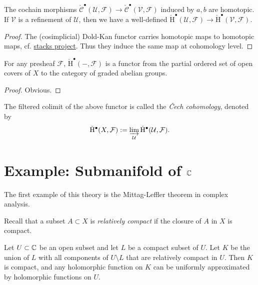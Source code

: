 \documentclass{article}
\newcommand{\Cech}{\v{C}ech}
\newcommand{\cC}{\check{\mathcal{C}}}
\newcommand{\cH}{\check{\mathrm{H}}}
\begin{document}
\begin{corollary}
    The cochain morphisms $\cC^{\bullet}(\mathcal{U},\mathcal{F})\to \cC^{\bullet}(\mathcal{V},\mathcal{F})$ induced by $a,b$ are homotopic. If $\mathcal{V}$ is a refinement of $\mathcal{U}$, then we have a well-defined $\cH^{\bullet}(\mathcal{U},\mathcal{F})\to \cH^{\bullet}(\mathcal{V},\mathcal{F})$.
\end{corollary}

\begin{proof}
    The (cosimplicial) Dold-Kan functor carries homotopic maps to homotopic maps, cf. \href{https://stacks.math.columbia.edu/tag/01A0}{stacks project}. Thus they induce the same map at cohomology level.
\end{proof}

\begin{corollary}
    For any presheaf $\mathcal{F}$, $\cH^{\bullet}(-,\mathcal{F})$ is a functor from the partial ordered set of open covers of $X$ to the category of graded abelian groups.
\end{corollary}

\begin{proof}
    Obvious.
\end{proof}

\begin{definition}
    The filtered colimit of the above functor is called the \emph{\Cech{} cohomology}, denoted by 
    \[
        \cH^{\bullet}(X,\mathcal{F}) := \varinjlim_{\mathcal{U}} \cH^{\bullet}(\mathcal{U},\mathcal{F}).
    \]
\end{definition}

\section{Example: Submanifold of \texorpdfstring{$\mathbb{C}$}{C}}

The first example of this theory is the Mittag-Leffler theorem in complex analysis.

Recall that a subset $A\subset X$ is \emph{relatively compact} if the closure of $A$ in $X$ is compact. 
\begin{lemma}\label{lem.holapprox}
    Let $U\subset\mathbb{C}$ be an open subset and let $L$ be a compact subset of $U$. Let $K$ be the union of $L$ with all components of $U\setminus L$ that are relatively compact in $U$. Then $K$ is compact, and any holomorphic function on $K$ can be uniformly approximated by holomorphic functions on $U$.
\end{lemma}
\end{document}
